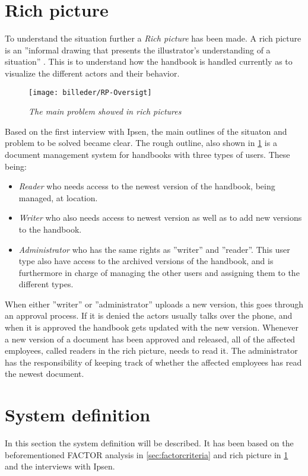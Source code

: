\section{Rich picture} \label{sec:richpictures}

To understand the situation further a \textit{Rich picture} has been made. A rich picture is an ''informal drawing that presents the illustrator's understanding of a situation'' \citep[~p. 26]{Rod-Aalborg}.
This is to understand how the handbook is handled currently as to visualize the different actors and their behavior.

\begin{figure}[H]
	\centering
	\texttt{[image: billeder/RP-Oversigt]}
	\caption{\textit{The main problem showed in rich pictures
	}}
	\label{fig:RP-Oversigt}
\end{figure}

Based on the first interview with Ipsen, the main outlines of the situaton and problem to be solved became clear.
The rough outline, also shown in \cref{fig:RP-Oversigt} is a document management system for handbooks with three types of users. These being: 
\begin{itemize}
	\item 
	 \textit{Reader} who needs access to the newest version of the handbook, being managed, at location.
	\item 
	 \textit{Writer} who also needs access to newest version as well as to add new versions to the handbook.
	\item 
	 \textit{Administrator} who has the same rights as ''writer'' and ''reader''.
	 This user type also have access to the archived versions of the handbook, and is furthermore in charge of managing the other users and assigning them to the different types.
\end{itemize}
When either ''writer'' or ''administrator'' uploads a new version, this goes through an approval process.
If it is denied the actors usually talks over the phone, and when it is approved the handbook gets updated with the new version.
Whenever a new version of a document has been approved and released, all of the affected employees, called readers in the rich picture, needs to read it.
The administrator has the responsibility of keeping track of whether the affected employees has read the newest document.

\section{System definition}
In this section the system definition will be described. 
It has been based on the beforementioned FACTOR analysis in \cref{sec:factorcriteria} and rich picture in \cref{sec:richpictures} and the interviews with Ipsen.

